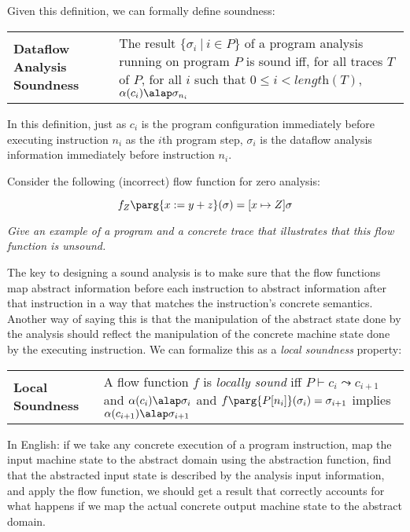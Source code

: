 \documentclass[11pt]{article}
\newcommand{\definition}[2]
  {\bigskip
   \begin{tabular}{p{1.5in}p{4.0in}}
        \textbf{#1} & #2 \\
        \end{tabular}
  }
\begin{document}

\noindent Given this definition, we can formally define soundness:

\definition{Dataflow Analysis Soundness}{The result $\{ \sigma_i ~|~ i \in P \}$ of a program analysis running on program $P$ is sound iff, for all traces $T$ of $P$, for all $i$ such that $0 \le i < \textit{length}(T)$, $\alpha(c_i) \alap \sigma_{n_i}$}

In this definition, just as $c_i$ is the program configuration immediately before executing instruction $n_i$ as the $i$th program step, $\sigma_i$ is the dataflow analysis information immediately before instruction $n_i$.




  Consider the following (incorrect) flow function for zero analysis:

\[
f_Z\parg{x := y + z}(\sigma) = [x \mapsto Z]\sigma
\]

\noindent \emph{Give an example of a program and a concrete trace that illustrates that this flow function is unsound.}



The key to designing a sound analysis is to make sure that the flow functions map abstract information before each instruction to abstract information after that instruction in a way that matches the instruction's concrete semantics.  Another way of saying this is that the manipulation of the abstract state done by the analysis should reflect the  manipulation of the concrete machine state done by the executing instruction.  We can formalize this as a \textit{local soundness} property:

\definition{Local Soundness}{A flow function $f$ is \textit{locally sound} iff $P \vdash c_i \leadsto c_{i+1}$ and $\alpha(c_i) \alap \sigma_i$ and $f\parg{P[n_i]}(\sigma_i) = \sigma_{i+1}$ implies $\alpha(c_{i+1}) \alap \sigma_{i+1}$}

In English: if we take any concrete execution of a program instruction, map the input machine state to the abstract domain using the abstraction function, find that the abstracted input state is described by the analysis input information, and apply the flow function, we should get a result that correctly accounts for what happens if we map the actual concrete output machine state to the abstract domain.
\end{document}
